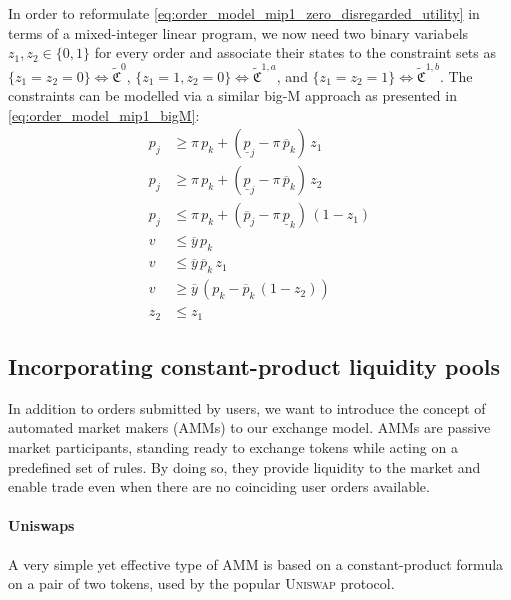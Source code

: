 \documentclass[11pt,parskip=full]{scrartcl}%
\begin{document}
In order to reformulate \eqref{eq:order_model_mip1_zero_disregarded_utility} in terms of a mixed-integer linear program, we now need two binary variabels $z_1, z_2 \in \{0,1\}$ for every order and associate their states to the constraint sets as $\{z_1 = z_2 = 0\} \Leftrightarrow \tilde{\mathfrak{C}}^0$, $\{z_1 = 1, z_2 = 0\} \Leftrightarrow \tilde{\mathfrak{C}}^{1,a}$, and $\{z_1 = z_2 = 1\} \Leftrightarrow \tilde{\mathfrak{C}}^{1,b}$.
The constraints can be modelled via a similar big-M approach as presented in \eqref{eq:order_model_mip1_bigM}:
\begin{subequations}
\begin{align}
  p_j &\ge \pi \, p_k
    + (\underline{p}_j - \pi \, \overline{p}_k) \, z_1 \\[1mm]
  p_j &\ge \pi \, p_k
    + (\underline{p}_j - \pi \, \overline{p}_k) \, z_2 \\[1mm]
  p_j &\le \pi \, p_k
    + (\overline{p}_j - \pi \, \underline{p}_k) \, (1-z_1) \\[1mm]
  v &\le \overline{y} \, p_k \\[1mm]
  v &\le \overline{y} \, \overline{p}_k \, z_1 \\[1mm]
  v &\ge \overline{y} \, (p_k - \overline{p}_k \, (1-z_2)) \\[1mm]
  z_2 &\le z_1
\end{align}
\label{eq:order_model_mip1_bigM}
\end{subequations}


\newpage
\subsection{Incorporating constant-product liquidity pools}

In addition to orders submitted by users, we want to introduce the concept of automated market makers (AMMs) to our exchange model.
AMMs are passive market participants, standing ready to exchange tokens while acting on a predefined set of rules.
By doing so, they provide liquidity to the market and enable trade even when there are no coinciding user orders available.

\paragraph{Uniswaps}

A very simple yet effective type of AMM is based on a constant-product formula on a pair of two tokens, used by the popular \textsc{Uniswap} protocol.
\end{document}
